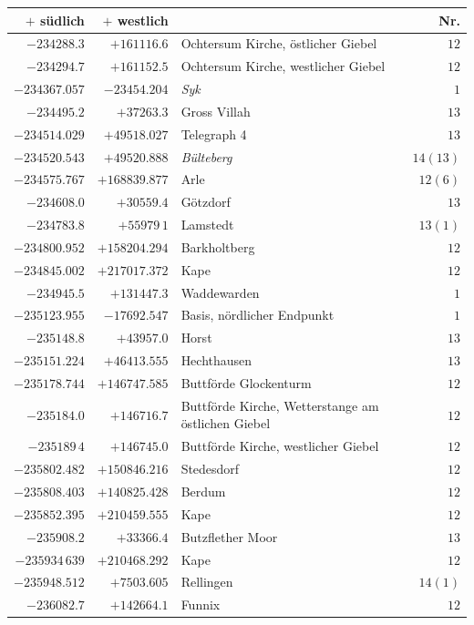 \begin{center}\begingroup\fontsize{8}{9}\selectfont
\setlength{\tabcolsep}{4pt}
\begin{tabular}{r|r|p{170pt}|r}\hline
\(+\) südlich&\(+\) westlich&&Nr.\\\hline
\(-234288.3\)&\(+161116.6\)&Ochtersum Kirche, östlicher Giebel&\(12\)\\
\(-234294.7\)&\(+161152.5\)&Ochtersum Kirche, westlicher Giebel&\(12\)\\
\(-234367.057\)&\(-23454.204\)&\textit{Syk}&\(1\)\\
\(-234495.2\)&\(+37263.3\)&Gross Villah&\(13\)\\
\(-234514.029\)&\(+49518.027\)&Telegraph 4&\(13\)\\
\(-234520.543\)&\(+49520.888\)&\textit{Bülteberg}&\(14(13)\)\\
\(-234575.767\)&\(+168839.877\)&Arle&\(12(6)\)\\
\(-234608.0\)&\(+30559.4\)&Götzdorf&\(13\)\\
\(-234783.8\)&\(+55979\,1\)&Lamstedt&\(13(1)\)\\
\(-234800.952\)&\(+158204.294\)&Barkholtberg&\(12\)\\
\(-234845.002\)&\(+217017.372\)&Kape&\(12\)\\
\(-234945.5\)&\(+131447.3\)&Waddewarden&\(1\)\\
\(-235123.955\)&\(-17692.547\)&Basis, nördlicher Endpunkt&\(1\)\\
\(-235148.8\)&\(+43957.0\)&Horst&\(13\)\\
\(-235151.224\)&\(+46413.555\)&Hechthausen&\(13\)\\
\(-235178.744\)&\(+146747.585\)&Buttförde Glockenturm&\(12\)\\
\(-235184.0\)&\(+146716.7\)&Buttförde Kirche, Wetterstange am östlichen Giebel&\(12\)\\
\(-235189\,4\)&\(+146745.0\)&Buttförde Kirche, westlicher Giebel&\(12\)\\
\(-235802.482\)&\(+150846.216\)&Stedesdorf&\(12\)\\
\(-235808.403\)&\(+140825.428\)&Berdum&\(12\)\\
\(-235852.395\)&\(+210459.555\)&Kape&\(12\)\\
\(-235908.2\)&\(+33366.4\)&Butzflether Moor&\(13\)\\
\(-235934\,639\)&\(+210468.292\)&Kape&\(12\)\\
\(-235948.512\)&\(+7503.605\)&Rellingen&\(14(1)\)\\
\(-236082.7\)&\(+142664.1\)&Funnix&\(12\)\\

\end{tabular}
\end{center}
